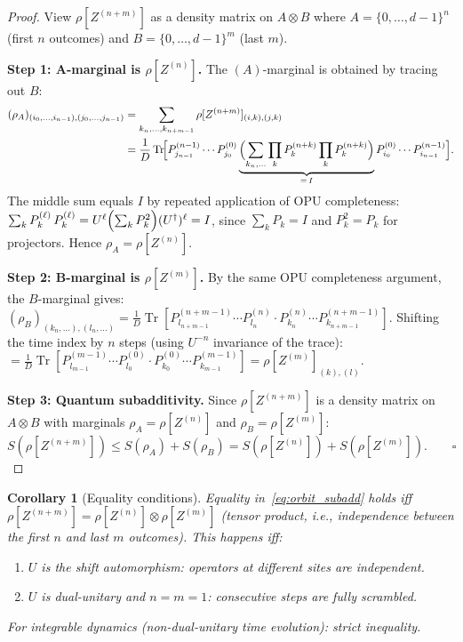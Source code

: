 \documentclass[12pt,a4paper]{article}
\newtheorem{corollary}[theorem]{Corollary}
\newcommand{\Tr}{\operatorname{Tr}}
\begin{document}
\begin{proof}
View $\rho[Z^{(n+m)}]$ as a density matrix on $A\otimes B$ where
$A=\{0,\ldots,d-1\}^n$ (first $n$ outcomes) and $B=\{0,\ldots,d-1\}^m$ (last $m$).

\textbf{Step 1: A-marginal is $\rho[Z^{(n)}]$.}
The $(A)$-marginal is obtained by tracing out $B$:
\begin{align*}
  (\rho_A)_{(i_0,\ldots,i_{n-1}),(j_0,\ldots,j_{n-1})}
  &= \sum_{k_n,\ldots,k_{n+m-1}} \rho[Z^{(n+m)}]_{(i,k),(j,k)}\\
  &= \frac{1}{D}\Tr\!\Bigl[P_{j_{n-1}}^{(n-1)}\cdots P_{j_0}^{(0)}
     \underbrace{\Bigl(\sum_{k_n,\ldots}\prod_k P_{k}^{(n+k)}\prod_k P_{k}^{(n+k)}\Bigr)}_{=\,I}
     P_{i_0}^{(0)}\cdots P_{i_{n-1}}^{(n-1)}\Bigr].
\end{align*}
The middle sum equals $I$ by repeated application of OPU completeness:
$\sum_k P_k^{(\ell)}\,P_k^{(\ell)} = U^\ell\Bigl(\sum_k P_k^2\Bigr)(U^\dagger)^\ell = I$,
since $\sum_k P_k = I$ and $P_k^2=P_k$ for projectors.
Hence $\rho_A = \rho[Z^{(n)}]$.

\textbf{Step 2: B-marginal is $\rho[Z^{(m)}]$.}
By the same OPU completeness argument, the $B$-marginal gives:
$({\rho_B})_{(k_n,...),(l_n,...)} = \frac{1}{D}\Tr[P_{l_{n+m-1}}^{(n+m-1)}\cdots P_{l_n}^{(n)}\cdot P_{k_n}^{(n)}\cdots P_{k_{n+m-1}}^{(n+m-1)}]$.
Shifting the time index by $n$ steps (using $U^{-n}$ invariance of the trace):
$= \frac{1}{D}\Tr[P_{l_{m-1}}^{(m-1)}\cdots P_{l_0}^{(0)}\cdot P_{k_0}^{(0)}\cdots P_{k_{m-1}}^{(m-1)}]
= \rho[Z^{(m)}]_{(k),(l)}$.

\textbf{Step 3: Quantum subadditivity.}
Since $\rho[Z^{(n+m)}]$ is a density matrix on $A\otimes B$ with marginals
$\rho_A=\rho[Z^{(n)}]$ and $\rho_B=\rho[Z^{(m)}]$:
\begin{equation}
  S(\rho[Z^{(n+m)}]) \le S(\rho_A) + S(\rho_B)
  = S(\rho[Z^{(n)}]) + S(\rho[Z^{(m)}]).\qquad\square
\end{equation}
\end{proof}

\begin{corollary}[Equality conditions]\label{cor:subadd_equality}
Equality in~\eqref{eq:orbit_subadd} holds iff $\rho[Z^{(n+m)}]=\rho[Z^{(n)}]\otimes\rho[Z^{(m)}]$
(tensor product, i.e., independence between the first $n$ and last $m$ outcomes).
This happens iff:
\begin{enumerate}
\item[(a)] $U$ is the \emph{shift} automorphism: operators at different sites are independent.
\item[(b)] $U$ is \emph{dual-unitary} and $n=m=1$: consecutive steps are fully scrambled.
\end{enumerate}
For integrable dynamics (non-dual-unitary time evolution): strict inequality.
\end{corollary}
\end{document}
